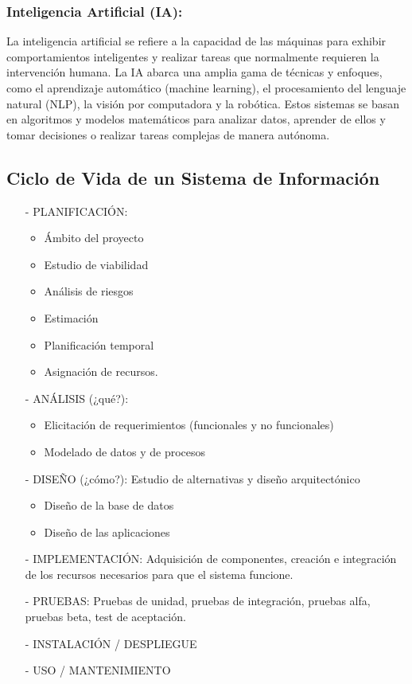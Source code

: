 \documentclass[12pt,a4paper]{article}
\begin{document}
\subsubsection*{Inteligencia Artificial (IA):} La inteligencia artificial se refiere a la capacidad de las máquinas para exhibir comportamientos inteligentes y realizar tareas que normalmente requieren la intervención humana. La IA abarca una amplia gama de técnicas y enfoques, como el aprendizaje automático (machine learning), el procesamiento del lenguaje natural (NLP), la visión por computadora y la robótica. Estos sistemas se basan en algoritmos y modelos matemáticos para analizar datos, aprender de ellos y tomar decisiones o realizar tareas complejas de manera autónoma.
\cite{kendall}

\subsection*{Ciclo de Vida de un Sistema de Información}
\begin{itemize}
    \item[-] PLANIFICACIÓN:
    \begin{itemize}
        \item Ámbito del proyecto
        \item Estudio de viabilidad
        \item Análisis de riesgos
        \item Estimación
        \item Planificación temporal
        \item Asignación de recursos.
    \end{itemize}
    \item[-] ANÁLISIS (¿qué?):
    \begin{itemize}
        \item Elicitación de requerimientos (funcionales y no funcionales)
        \item Modelado de datos y de procesos
    \end{itemize}
    \item[-] DISEÑO (¿cómo?): Estudio de alternativas y diseño arquitectónico
    \begin{itemize}
        \item Diseño de la base de datos
        \item Diseño de las aplicaciones
    \end{itemize}
    \item[-] IMPLEMENTACIÓN: Adquisición de componentes, creación e integración de los recursos necesarios para que el sistema funcione.
    \item[-] PRUEBAS: Pruebas de unidad, pruebas de integración, pruebas alfa, pruebas beta, test de aceptación.
    \item[-] INSTALACIÓN / DESPLIEGUE
    \item[-] USO / MANTENIMIENTO
\end{itemize}
\end{document}
